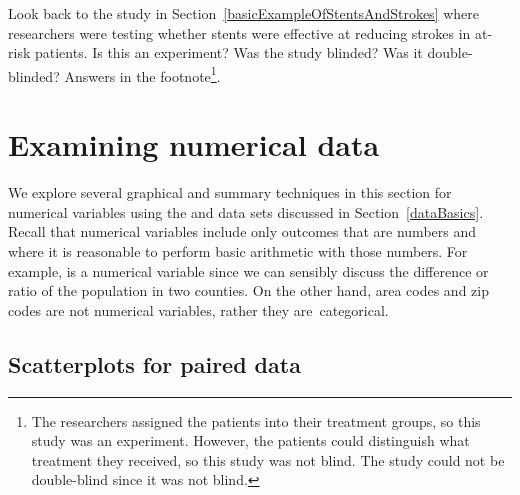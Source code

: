 \begin{exercise}
Look back to the study in Section~\ref{basicExampleOfStentsAndStrokes} where researchers were testing whether stents were effective at reducing strokes in at-risk patients. Is this an experiment? Was the study blinded? Was it double-blinded? Answers in the footnote\footnote{The researchers assigned the patients into their treatment groups, so this study was an experiment. However, the patients could distinguish what treatment they received, so this study was not blind. The study could not be double-blind since it was not blind.}.
\end{exercise}


\section{Examining numerical data}
\label{numericalData}

We explore several graphical and summary techniques in this section for numerical variables using the  and  data sets discussed in Section~\ref{dataBasics}. Recall that numerical variables include only outcomes that are numbers and where it is reasonable to perform basic arithmetic with those numbers. For example,  is a numerical variable since we can sensibly discuss the difference or ratio of the population in two counties. On the other hand, area codes and zip codes are not numerical variables, rather they are~categorical.


\subsection{Scatterplots for paired data}
\label{scatterPlots}


